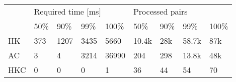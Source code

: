 \begin{tabular}{l|llll|llll}
\multirow{2}{*}{} & \multicolumn{4}{l|}{Required time {[}ms{]}} & \multicolumn{4}{l}{Processed pairs} \\ \cline{2-9}
                  & 50\% & 90\%  & 99\% & 100\%                 & 50\%    & 90\%   & 99\%    & 100\%  \\ \hline
HK                & 373  & 1207  & 3435 & 5660                  & 10.4k   & 28k    & 58.7k   & 87k    \\
AC                & 3    & 4     & 3214 & 36990                 & 204     & 298    & 13.8k   & 48k    \\
HKC               & 0    & 0     & 0    & 1                     & 36      & 44     & 54      & 70     \\
\end{tabular}
